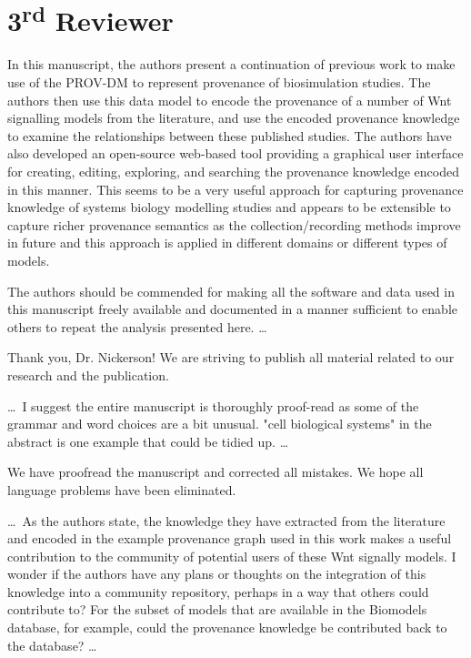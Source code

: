 \documentclass{article}
\begin{document}
\section*{3\textsuperscript{rd} Reviewer}

\begin{mdframed}
In this manuscript, the authors present a continuation of previous work to make use of the PROV-DM to represent provenance of biosimulation studies.
The authors then use this data model to encode the provenance of a number of Wnt signalling models from the literature, and use the encoded provenance knowledge to examine the relationships between these published studies.
The authors have also developed an open-source web-based tool providing a graphical user interface for creating, editing, exploring, and searching the provenance knowledge encoded in this manner.
This seems to be a very useful approach for capturing provenance knowledge of systems biology modelling studies and appears to be extensible to capture richer provenance semantics as the collection/recording methods improve in future and this approach is applied in different domains or different types of models.

The authors should be commended for making all the software and data used in this manuscript freely available and documented in a manner sufficient to enable others to repeat the analysis presented here. \ldots
\end{mdframed}

Thank you, Dr. Nickerson!
We are striving to publish all material related to our research and the publication.

\begin{mdframed}
\ldots\, I suggest the entire manuscript is thoroughly proof-read as some of the grammar and word choices are a bit unusual. "cell biological systems" in the abstract is one example that could be tidied up. \ldots
\end{mdframed}

We have proofread the manuscript and corrected all mistakes.
We hope all language problems have been eliminated.

\begin{mdframed}
\ldots\, As the authors state, the knowledge they have extracted from the literature and encoded in the example provenance graph used in this work makes a useful contribution to the community of potential users of these Wnt signally models.
I wonder if the authors have any plans or thoughts on the integration of this knowledge into a community repository, perhaps in a way that others could contribute to?
For the subset of models that are available in the Biomodels database, for example, could the provenance knowledge be contributed back to the database? \ldots
\end{mdframed}
\end{document}
